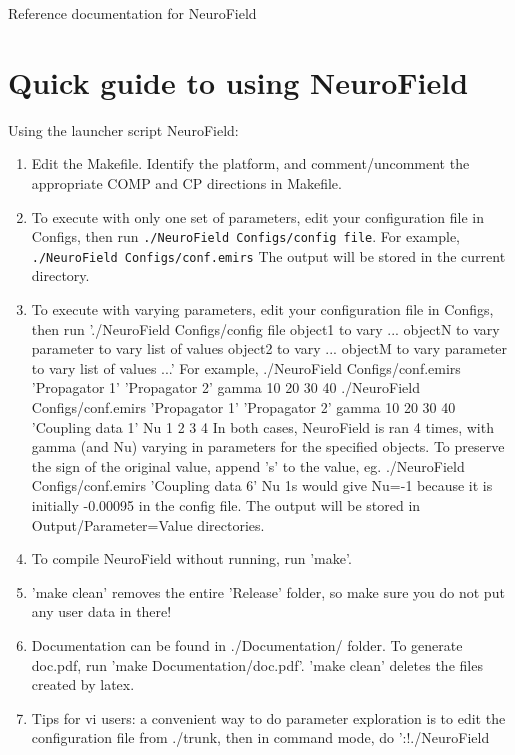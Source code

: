 \documentclass[12pt,a4paper]{article}
\newcommand{\code}[1]{\texttt{#1}}
\begin{document}
 

{\center \Huge{Reference documentation for NeuroField}}

\section{Quick guide to using NeuroField}

Using the launcher script NeuroField:
\begin{enumerate}
\item Edit the Makefile. Identify the platform, and comment/uncomment the appropriate COMP and CP directions in Makefile.
\item To execute with only one set of parameters, edit your configuration file in Configs, then run \code{./NeuroField Configs/config file}. For example,
   \code{./NeuroField Configs/conf.emirs}
   The output will be stored in the current directory.

\item To execute with varying parameters, edit your configuration file in Configs, then run './NeuroField Configs/config file object1 to vary ... objectN to vary parameter to vary list of values object2 to vary ... objectM to vary parameter to vary list of values ...' For example,
   ./NeuroField Configs/conf.emirs 'Propagator 1' 'Propagator 2' gamma 10 20 30 40
   ./NeuroField Configs/conf.emirs 'Propagator 1' 'Propagator 2' gamma 10 20 30 40 'Coupling data 1' Nu 1 2 3 4
   In both cases, NeuroField is ran 4 times, with gamma (and Nu) varying in parameters for the specified objects.
   To preserve the sign of the original value, append 's' to the value, eg.
      ./NeuroField Configs/conf.emirs 'Coupling data 6' Nu 1s
      would give Nu=-1 because it is initially -0.00095 in the config file.
   The output will be stored in Output/Parameter=Value directories.

\item To compile NeuroField without running, run 'make'.

\item 'make clean' removes the entire 'Release' folder, so make sure you do not put any user data in there! 

\item Documentation can be found in ./Documentation/ folder. To generate doc.pdf, run 'make Documentation/doc.pdf'. 'make clean' deletes the files created by latex.

\item Tips for vi users: a convenient way to do parameter exploration is to edit the configuration file from ./trunk, then in command mode, do ':!./NeuroField %
\end{enumerate}
\end{document}
